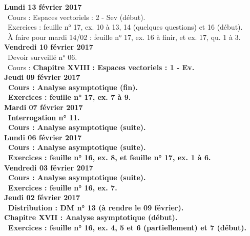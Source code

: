 \documentclass[12pt,a4paper]{article}
\begin{document}
\noindent\textbf{\bf Lundi 13 février 2017} \\
\bu\ Cours : Espaces vectoriels : 2 - Sev (début).\\
\bu\ Exercices : feuille n° 17, ex. 10 à 13, 14 (quelques questions) et 16 (début).\\
\bu\ À faire pour mardi 14/02 : feuille n° 17, ex. 16 à finir, et ex. 17, qu. 1 à 3.\vspace{.4cm}\\

\noindent\textbf{Vendredi 10 février 2017}\\
\bu\ Devoir surveillé n° 06.\\
\bu\ Cours : \bf Chapitre XVIII \rm : Espaces vectoriels : 1 - Ev.\vspace{.4cm}\\ 

\noindent\textbf{Jeudi 09 février 2017}\\
\bu\ Cours : Analyse asymptotique (fin).\\
\bu\ Exercices : feuille n° 17, ex. 7 à 9.\vspace{.4cm}\\

\noindent\textbf{\bf Mardi 07 février 2017} \\
\bu\ Interrogation n° 11.\\
\bu\ Cours : Analyse asymptotique (suite).\vspace{.4cm}\\

\noindent\textbf{\bf Lundi 06 février 2017} \\
\bu\ Cours : Analyse asymptotique (suite).\\
\bu\ Exercices : feuille n° 16, ex. 8, et feuille n° 17, ex. 1 à 6.\vspace{.4cm}\\

\noindent\textbf{Vendredi 03 février 2017}\\
\bu\ Cours : Analyse asymptotique (suite).\\
\bu\ Exercices : feuille n° 16, ex. 7.\vspace{.4cm}\\

\noindent\textbf{Jeudi 02 février 2017}\\
\bu\ Distribution : DM n° 13 (à rendre le 09 février).\\
\bf Chapitre XVII \rm : Analyse asymptotique (début).\\
\bu\ Exercices : feuille n° 16, ex. 4, 5 et 6 (partiellement) et 7 (début).\vspace{.4cm}\\
\end{document}
